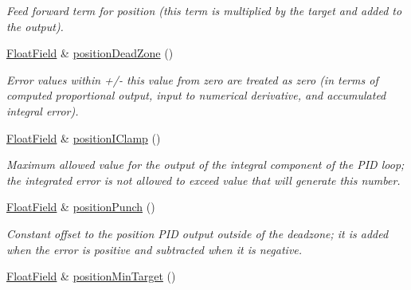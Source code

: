 \begin{DoxyCompactItemize}
\begin{DoxyCompactList}\small\item\em Feed forward term for position (this term is multiplied by the target and added to the output). \end{DoxyCompactList}\item 
\hyperlink{classhebi_1_1Command_1_1FloatField}{Float\+Field} \& \hyperlink{classhebi_1_1Command_1_1Settings_1_1Actuator_1_1PositionGains_a074cdcff244cca024fd52d3b2d748e9c}{position\+Dead\+Zone} ()\hypertarget{classhebi_1_1Command_1_1Settings_1_1Actuator_1_1PositionGains_a074cdcff244cca024fd52d3b2d748e9c}{}\label{classhebi_1_1Command_1_1Settings_1_1Actuator_1_1PositionGains_a074cdcff244cca024fd52d3b2d748e9c}

\begin{DoxyCompactList}\small\item\em Error values within +/-\/ this value from zero are treated as zero (in terms of computed proportional output, input to numerical derivative, and accumulated integral error). \end{DoxyCompactList}\item 
\hyperlink{classhebi_1_1Command_1_1FloatField}{Float\+Field} \& \hyperlink{classhebi_1_1Command_1_1Settings_1_1Actuator_1_1PositionGains_a27a970858bd6ca1c4d8b7b99d49c6558}{position\+I\+Clamp} ()\hypertarget{classhebi_1_1Command_1_1Settings_1_1Actuator_1_1PositionGains_a27a970858bd6ca1c4d8b7b99d49c6558}{}\label{classhebi_1_1Command_1_1Settings_1_1Actuator_1_1PositionGains_a27a970858bd6ca1c4d8b7b99d49c6558}

\begin{DoxyCompactList}\small\item\em Maximum allowed value for the output of the integral component of the P\+ID loop; the integrated error is not allowed to exceed value that will generate this number. \end{DoxyCompactList}\item 
\hyperlink{classhebi_1_1Command_1_1FloatField}{Float\+Field} \& \hyperlink{classhebi_1_1Command_1_1Settings_1_1Actuator_1_1PositionGains_ab2a896cf7246703211ae6c5bef75b1c6}{position\+Punch} ()\hypertarget{classhebi_1_1Command_1_1Settings_1_1Actuator_1_1PositionGains_ab2a896cf7246703211ae6c5bef75b1c6}{}\label{classhebi_1_1Command_1_1Settings_1_1Actuator_1_1PositionGains_ab2a896cf7246703211ae6c5bef75b1c6}

\begin{DoxyCompactList}\small\item\em Constant offset to the position P\+ID output outside of the deadzone; it is added when the error is positive and subtracted when it is negative. \end{DoxyCompactList}\item 
\hyperlink{classhebi_1_1Command_1_1FloatField}{Float\+Field} \& \hyperlink{classhebi_1_1Command_1_1Settings_1_1Actuator_1_1PositionGains_aeaa99efab55ec3de8cf97ccdee6e0a53}{position\+Min\+Target} ()\hypertarget{classhebi_1_1Command_1_1Settings_1_1Actuator_1_1PositionGains_aeaa99efab55ec3de8cf97ccdee6e0a53}{}\label{classhebi_1_1Command_1_1Settings_1_1Actuator_1_1PositionGains_aeaa99efab55ec3de8cf97ccdee6e0a53}


\end{DoxyCompactItemize}
